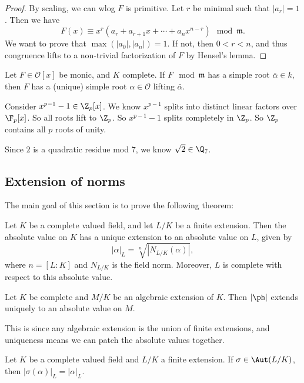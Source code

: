 \documentclass[a4paper]{article}
\begin{document}
\begin{proof}
  By scaling, we can wlog $F$ is primitive. Let $r$ be minimal such that $|a_r| = 1$. Then we have
  \[
    F(x) \equiv x^r (a_r + a_{r + 1}x + \cdots + a_n x^{n - r})\mod \mathfrak{m}.
  \]
  We want to prove that $\max(|a_0|, |a_n|) = 1$. If not, then $0 < r < n$, and thus congruence lifts to a non-trivial factorization of $F$ by Hensel's lemma.
\end{proof}

\begin{cor}
  Let $F \in \mathcal{O}[x]$ be monic, and $K$ complete. If $F \mod \mathfrak{m}$ has a simple root $\bar{\alpha} \in k$, then $F$ has a (unique) simple root $\alpha \in \mathcal{O}$ lifting $\bar{\alpha}$.
\end{cor}

\begin{eg}
  Consider $x^{p - 1} - 1 \in \Z_p[x]$. We know $x^{p - 1}$ splits into distinct linear factors over $\F_p[x]$. So all roots lift to $\Z_p$. So $x^{p - 1} - 1$ splits completely in $\Z_p$. So $\Z_p$ contains all $p$ roots of unity.
\end{eg}

\begin{eg}
  Since $2$ is a quadratic residue mod $7$, we know $\sqrt{2} \in \Q_7$.
\end{eg}

\subsection{Extension of norms}
The main goal of this section is to prove the following theorem:
\begin{thm}
  Let $K$ be a complete valued field, and let $L/K$ be a finite extension. Then the absolute value on $K$ has a unique extension to an absolute value on $L$, given by
  \[
    |\alpha|_L = \sqrt[n]{|N_{L/K}(\alpha)|},
  \]
  where $n = [L:K]$ and $N_{L/K}$ is the field norm. Moreover, $L$ is complete with respect to this absolute value.
\end{thm}

\begin{cor}
  Let $K$ be complete and $M/K$ be an algebraic extension of $K$. Then $|\ph|$ extends uniquely to an absolute value on $M$.
\end{cor}
This is since any algebraic extension is the union of finite extensions, and uniqueness means we can patch the absolute values together.

\begin{cor}
  Let $K$ be a complete valued field and $L/K$ a finite extension. If $\sigma \in \Aut(L/K)$, then $|\sigma(\alpha)|_L = |\alpha|_L$.
\end{cor}
\end{document}

